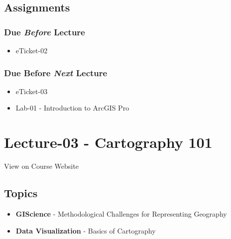\documentclass[]{book}
\providecommand{\tightlist}{%
  \setlength{\itemsep}{0pt}\setlength{\parskip}{0pt}}
\begin{document}
\hypertarget{assignments-3}{%
\subsection*{Assignments}\label{assignments-3}}

\hypertarget{due-before-lecture-1}{%
\subsubsection*{\texorpdfstring{Due \emph{Before} Lecture}{Due Before Lecture}}\label{due-before-lecture-1}}

\begin{itemize}
\tightlist
\item
  eTicket-02
\end{itemize}

\hypertarget{due-before-next-lecture}{%
\subsubsection*{\texorpdfstring{Due Before \emph{Next} Lecture}{Due Before Next Lecture}}\label{due-before-next-lecture}}

\begin{itemize}
\tightlist
\item
  eTicket-03
\item
  Lab-01 - Introduction to ArcGIS Pro
\end{itemize}

\hypertarget{lecture-03---cartography-101}{%
\section*{Lecture-03 - Cartography 101}\label{lecture-03---cartography-101}}

View on Course Website

\hypertarget{topics-3}{%
\subsection*{Topics}\label{topics-3}}

\begin{itemize}
\tightlist
\item
  \textbf{GIScience} - Methodological Challenges for Representing Geography
\item
  \textbf{Data Visualization} - Basics of Cartography
\end{itemize}
\end{document}
